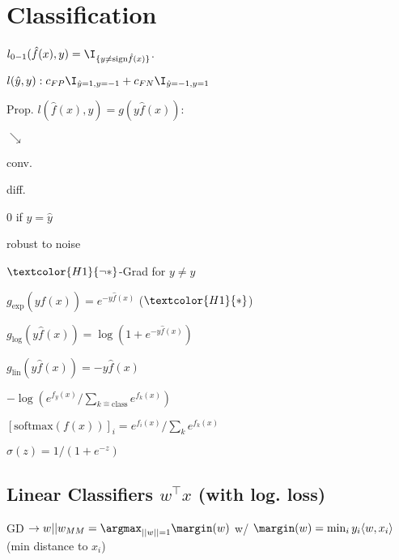 \section{Classification}
\begin{definition}
  \(l_{0-1}(\hat{f}(x), y) = \I_{\{y \neq \text{sign} \hat{f}(x)\}}\).
\end{definition}
\begin{definition}[a\(_{0-1}\)]
  \(l(\hat{y}, y): c_{FP}\I_{\hat{y} = 1, y = -1} + c_{FN}\I_{\hat{y} = -1, y=1}\)
\end{definition}
Prop. \(l(\hat{f}(x), y) = g(y\hat{f}(x))\):
\begin{itemize*}
  \item \(\searrow\)
  \item conv.
  \item diff.
  \item 0 if \(y = \hat{y}\)
  \item robust to noise
  \item \(\textcolor{H1}{\lnot *}\)-Grad for \(y \neq \hat{y}\)
\end{itemize*}

\begin{definition}
  \(g_{\exp}(y\hat{f}(x)) = e^{-y\hat{f}(x)}\) (\(\textcolor{H1}{*}\))
\end{definition}

\begin{definition}
  \(g_{\text{log}}(y\hat{f}(x)) = \log(1+e^{-y\hat{f}(x)})\)
\end{definition}

\begin{definition}
  \(g_{\text{lin}}(y\hat{f}(x)) = -y\hat{f}(x)\)
\end{definition}

\begin{definition}
  \(- \log(e^{f_y(x)} / \sum_{k \hat{=} \text{class}} e^{f_k(x)})\)
\end{definition}

\begin{definition}[Softmax]
  \([\text{softmax}(f(x))]_i = e^{f_i(x)} / \sum_{k} e^{f_k(x)}\)
\end{definition}

\begin{definition}
  \(\sigma(z) = 1/ (1 + e^{-z})\)
\end{definition}

\subsection*{Linear Classifiers \(w^\top x\) (with log. loss)}
GD \(\to w || w_{MM} = \argmax_{||w|| = 1} \margin(w)\) w/
\(\margin(w) = \min_i y_i \langle w, x_i \rangle\) (min distance to \(x_i\))

